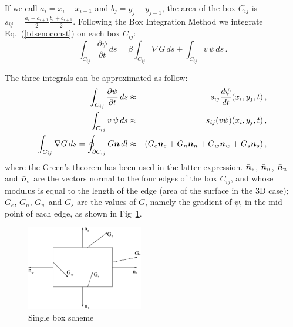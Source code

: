 \documentclass[a4paper,11pt]{article}
\newcommand{\ve}[1]{\mbox{\boldmath $ #1$}}
\begin{document}
If we call $a_i = x_i - x_{i-1}$ and
$b_j = y_j - y_{j-1}$, the area of the box $C_{ij}$ is
$s_{ij} = \frac{a_i+a_{i+1}}{2} \frac{b_i+b_{i+1}}{2}$.
Following the Box Integration Method we integrate Eq.~(\ref{tdsenoconst}) on each box $C_{ij}$:
\begin{equation}
\int_{C_{ij}} \frac{\partial \psi}{\partial t} \, ds = 
   \beta \int_{C_{ij}} \nabla G \, ds + 
   \int_{C_{ij}} v \, \psi \, ds \, .
\end{equation}

The three integrals can be approximated as follow:
\begin{eqnarray}
\int_{C_{ij}} \frac{\partial \psi}{\partial t} \, ds & \approx &
   s_{ij} \frac{d \psi}{dt}(x_i, y_j, t) \, , \\
\int_{C_{ij}} v \, \psi \, ds & \approx & s_{ij} (v \psi)(x_i, y_j, t) \, , \\
\int_{C_{ij}} \nabla G \, ds = \oint_{\partial C_{ij}} G \bar{\ve{n}} \, dl & \approx &
   (G_e \bar{\ve n}_e + G_n \bar{\ve n}_n + G_w \bar{\ve n}_w + G_s \bar{\ve n}_s) \, ,
   \label{green_int}
\end{eqnarray}
where the Green's theorem has been used in the latter expression.
$\bar{\ve n}_e$, $\bar{\ve n}_n$, $\bar{\ve n}_w$ and $\bar{\ve n}_s$ are the vectors normal to the four
edges of the box ${C_{ij}}$, and whose modulus is equal to the length of the edge (area of the surface in the 3D case);
$G_e$, $G_n$, $G_w$ and $G_s$ are the values of $G$, namely the gradient of $\psi$, in the mid point of each edge, as shown in Fig~\ref{fig:single_box}.

\begin{figure}
\centerline{\includegraphics[width=2in] {box.eps} }
\caption{Single box scheme}
\label{fig:single_box}
\end{figure}
\end{document}
